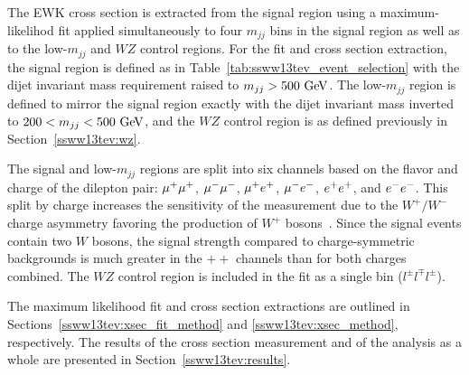
The \ssww EWK cross section is extracted from the signal region using a maximum-likelihod fit applied simultaneously to four $m_{jj}$ bins in the signal region as well as to the low-$m_{jj}$ and $WZ$ control regions.
For the fit and cross section extraction, the signal region is defined as in Table~\ref{tab:ssww13tev_event_selection} with the dijet invariant mass requirement raised to $m_{jj} > 500\gev$.
The low-$m_{jj}$ region is defined to mirror the signal region exactly with the dijet invariant mass inverted to $200 < m_{jj} < 500\gev$, and the $WZ$ control region is as defined previously in Section~\ref{ssww13tev:wz}.

The signal and low-$m_{jj}$ regions are split into six channels based on the flavor and charge of the dilepton pair: $\mu^{+}\mu^{+}$, $\mu^{-}\mu^{-}$, $\mu^{+}e^{+}$, $\mu^{-}e^{-}$, $e^{+}e^{+}$, and $e^{-}e^{-}$.
This split by charge increases the sensitivity of the measurement due to the $W^{+}/W^{-}$ charge asymmetry favoring the production of $W^{+}$ bosons~\cite{2010.w-charge-asymmetry}.
Since the signal events contain two $W$ bosons, the signal strength compared to charge-symmetric backgrounds is much greater in the $++$ channels than for both charges combined.
The $WZ$ control region is included in the fit as a single bin ($l^{\pm}l^{\mp}l^{\pm}$).

The maximum likelihood fit and cross section extractions are outlined in Sections~\ref{ssww13tev:xsec_fit_method} and \ref{ssww13tev:xsec_method}, respectively.
The results of the cross section measurement and of the analysis as a whole are presented in Section~\ref{ssww13tev:results}.

